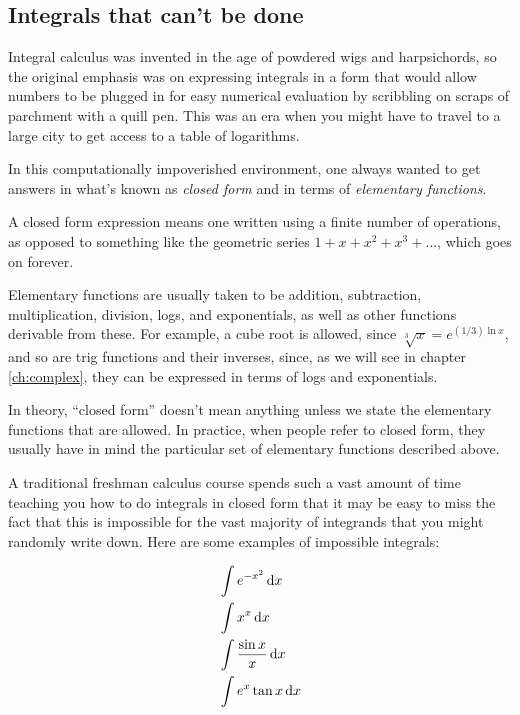 
\subsection{Integrals that can't be done}\label{impossible-integrals}

Integral calculus was invented in the age of powdered wigs and harpsichords, so the original emphasis
was on expressing integrals in a form that would allow numbers to be plugged in for easy numerical evaluation
by scribbling on scraps of parchment with a quill pen. This was an era when you might have to travel to a large
city to get access to a table of logarithms. 

In this computationally impoverished environment, one always
wanted to get answers in what's known as \emph{closed form} and in terms of \emph{elementary functions}.

A closed form expression means one written using a finite number of operations, as opposed to something
like the geometric series $1+x+x^2+x^3+\ldots$, which goes on forever.

Elementary functions are usually taken to be addition,
subtraction, multiplication, division, logs, and exponentials, as well as other functions derivable from
these. For example, a cube root is allowed, since $\sqrt[3]x=e^{(1/3)\ln x}$, and so are trig functions and their inverses,
since, as we will see in chapter \ref{ch:complex}, they can be expressed in terms of logs and exponentials.

In theory, ``closed form'' doesn't mean anything unless we state the elementary functions that are allowed.
In practice, when people refer to closed form, they usually have in mind the particular set of elementary functions described above.

A traditional freshman calculus course spends such a vast amount of time teaching you how to do integrals
in closed form that it may be easy to miss the fact that this is impossible for the vast majority of
integrands that you might randomly write down. Here are some examples of impossible integrals:

\begin{align*}
  & \int e^{-x^2} \operatorname{d\!} x \\
  & \int x^x \operatorname{d\!} x \\
  & \int \frac{\sin x}{x} \operatorname{d\!} x \\
  & \int e^x \tan x \operatorname{d\!} x
\end{align*}

